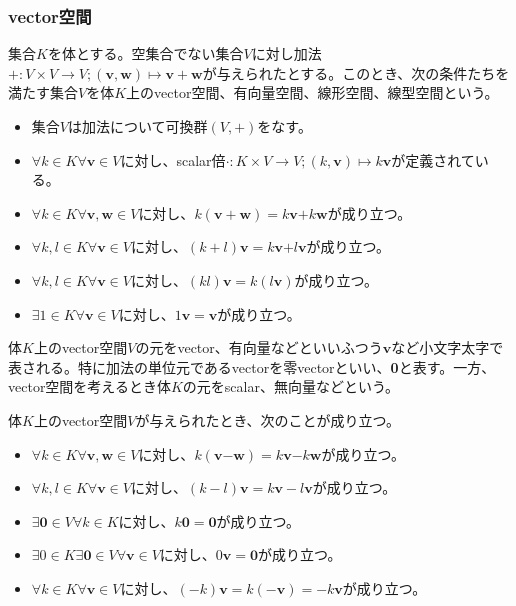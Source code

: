 \documentclass[dvipdfmx]{jsarticle}
\begin{document}
\subsubsection{vector空間}
\begin{axs}[vector空間の公理]
集合$K$を体とする。空集合でない集合$V$に対し加法$+ :V \times V \rightarrow V;\left( \mathbf{v},\mathbf{w} \right) \mapsto \mathbf{v} + \mathbf{w}$が与えられたとする。このとき、次の条件たちを満たす集合$V$を体$K$上のvector空間、有向量空間、線形空間、線型空間という。
\begin{itemize}
\item
  集合$V$は加法について可換群$(V, + )$をなす。
\item
  $\forall k \in K\forall\mathbf{v} \in V$に対し、scalar倍$\cdot :K \times V \rightarrow V;\left( k,\mathbf{v} \right) \mapsto k\mathbf{v}$が定義されている。
\item
  $\forall k \in K\forall\mathbf{v},\mathbf{w} \in V$に対し、$k\left( \mathbf{v} + \mathbf{w} \right) = k\mathbf{v}\mathbf{+}k\mathbf{w}$が成り立つ。
\item
  $\forall k,l \in K\forall\mathbf{v} \in V$に対し、$(k + l)\mathbf{v} = k\mathbf{v}\mathbf{+}l\mathbf{v}$が成り立つ。
\item
  $\forall k,l \in K\forall\mathbf{v} \in V$に対し、$(kl)\mathbf{v} = k\left( l\mathbf{v} \right)$が成り立つ。
\item
  $\exists 1 \in K\forall\mathbf{v} \in V$に対し、$1\mathbf{v} = \mathbf{v}$が成り立つ。
\end{itemize}
体$K$上のvector空間$V$の元をvector、有向量などといいふつう$\mathbf{v}$など小文字太字で表される。特に加法の単位元であるvectorを零vectorといい、\textbf{0}と表す。一方、vector空間を考えるとき体$K$の元をscalar、無向量などという。
\end{axs}
\begin{thm}\label{2.1.1.8}
体$K$上のvector空間$V$が与えられたとき、次のことが成り立つ。
\begin{itemize}
\item
  $\forall k \in K\forall\mathbf{v},\mathbf{w} \in V$に対し、$k\left( \mathbf{v}\mathbf{-}\mathbf{w} \right) = k\mathbf{v}\mathbf{-}k\mathbf{w}$が成り立つ。
\item
  $\forall k,l \in K\forall\mathbf{v} \in V$に対し、$(k - l)\mathbf{v} = k\mathbf{v} - l\mathbf{v}$が成り立つ。
\item
  $\exists\mathbf{0} \in V\forall k \in K$に対し、$k\mathbf{0} = \mathbf{0}$が成り立つ。
\item
  $\exists 0 \in K\exists\mathbf{0} \in V\forall\mathbf{v} \in V$に対し、$0\mathbf{v} = \mathbf{0}$が成り立つ。
\item
  $\forall k \in K\forall\mathbf{v} \in V$に対し、$( - k)\mathbf{v} = k\left( - \mathbf{v} \right) = - k\mathbf{v}$が成り立つ。
\end{itemize}
\end{thm}
\end{document}

